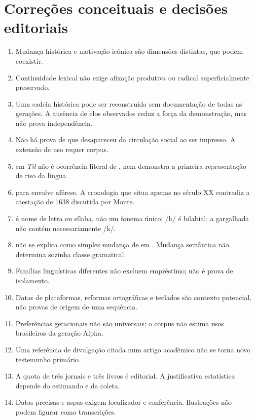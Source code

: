 \section{Correções conceituais e decisões editoriais}
\begin{enumerate}[leftmargin=*]
\item Mudança histórica e motivação icônica são dimensões distintas, que podem coexistir.
\item Continuidade lexical não exige afixação produtiva ou radical superficialmente preservado.
\item Uma cadeia histórica pode ser reconstruída sem documentação de todas as gerações. A ausência de elos observados reduz a força da demonstração, mas não prova independência.
\item Não há prova de que  desapareceu da circulação social ao ser impresso. A extensão de uso requer corpus.
\item {} em \textit{Til} não é ocorrência literal de , nem demonstra a primeira representação de riso da língua.
\item {} para  envolve aférese. A cronologia que situa  apenas no século XX contradiz a atestação de 1638 discutida por Monte.
\item {} é nome de letra ou sílaba, não um fonema único; /b/ é bilabial; a gargalhada não contém necessariamente /k/.
\item {} não se explica como simples mudança de  em . Mudança semântica não determina sozinha classe gramatical.
\item Famílias linguísticas diferentes não excluem empréstimo;  não é prova de isolamento.
\item Datas de plataformas, reformas ortográficas e teclados são contexto potencial, não provas de origem de uma sequência.
\item Preferências geracionais não são universais; o corpus não estima usos brasileiros da geração Alpha.
\item Uma referência de divulgação citada num artigo acadêmico não se torna novo testemunho primário.
\item A quota de três jornais e três livros é editorial. A justificativa estatística depende do estimando e da coleta.
\item Datas precisas e aspas exigem localizador e conferência. Ilustrações não podem figurar como transcrições.
\end{enumerate}

